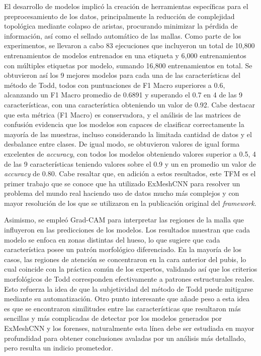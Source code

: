 El desarrollo de modelos implicó la creación de herramientas específicas para el preprocesamiento de los datos, principalmente la reducción de complejidad topológica mediante colapso de aristas, procurando minimizar la pérdida de información, así como el sellado automático de las mallas. Como parte de los experimentos, se llevaron a cabo 83 ejecuciones que incluyeron un total de 10,800 entrenamientos de modelos entrenados en una etiqueta y 6,000 entrenamientos con múltiples etiquetas por modelo, sumando 16,800 entrenamientos en total. Se obtuvieron así los 9 mejores modelos para cada una de las características del método de Todd, todos con puntuaciones de F1 Macro superiores a 0.6, alcanzando un F1 Macro promedio de 0.6891 y superando el 0.7 en 4 de las 9 características, con una característica obteniendo un valor de 0.92. Cabe destacar que esta métrica (F1 Macro) es conservadora, y el análisis de las matrices de confusión evidencia que los modelos son capaces de clasificar correctamente la mayoría de las muestras, incluso considerando la limitada cantidad de datos y el desbalance entre clases. De igual modo, se obtuvieron valores de igual forma excelentes de \textit{accuracy}, con todos los modelos obteniendo valores superior a 0.5, 4 de las 9 características teniendo valores sobre el 0.9 y un en promedio un valor de \textit{accuracy} de 0.80. Cabe resaltar que, en adición a estos resultados, este TFM es el primer trabajo que se conoce que ha utilizado ExMeshCNN para resolver un problema del mundo real haciendo uso de datos mucho más complejos y con mayor resolución de los que se utilizaron en la publicación original del \textit{framework}.

Asimismo, se empleó Grad-CAM para interpretar las regiones de la malla que influyeron en las predicciones de los modelos. Los resultados muestran que cada modelo se enfoca en zonas distintas del hueso, lo que sugiere que cada característica posee un patrón morfológico diferenciado. En la mayoría de los casos, las regiones de atención se concentraron en la cara anterior del pubis, lo cual coincide con la práctica común de los expertos, validando así que los criterios morfológicos de Todd corresponden efectivamente a patrones estructurales reales. Esto refuerza la idea de que la subjetividad del método de Todd puede mitigarse mediante su automatización. Otro punto interesante que añade peso a esta idea es que se encontraron similitudes entre las características que resultaron más sencillas y más complicadas de detectar por los modelos generados por ExMeshCNN y los forenses, naturalmente esta línea debe ser estudiada en mayor profundidad para obtener conclusiones avaladas por un análisis más detallado, pero resulta un indicio prometedor.

